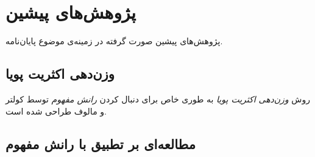 

\section{
پژوهش‌های پیشین
}

پژوهش‌های پیشین صورت گرفته در زمینه‌ی موضوع پایان‌نامه.









\subsection{
وزن‌دهی اکثریت پویا
}
روش 
\textit{
وزن‌دهی اکثریت پویا
} 
به طوری خاص برای دنبال کردن 
\textit{
رانش مفهوم
} 
توسط کولتر و مالوف
\cite{koltermaloof2003} 
طراحی شده است. 







\subsection{
مطالعه‌ای بر تطبیق با رانش مفهوم
}

















































